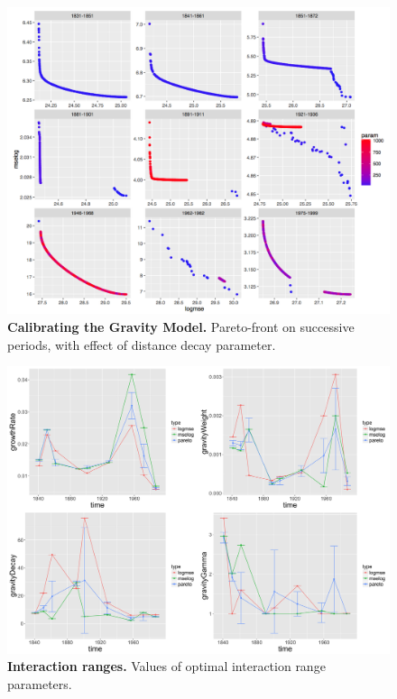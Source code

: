 \documentclass[Royal,sageh,times]{sagej}
\begin{document}
\begin{figure}
\centering
\includegraphics[width=\textwidth]{figures/Fig4}
\caption{\textbf{Calibrating the Gravity Model.} Pareto-front on successive periods, with effect of distance decay parameter.}
\label{fig:calib-gravity}
\end{figure}


\begin{figure}
\centering
\includegraphics[width=\textwidth]{figures/Fig5}
\caption{\textbf{Interaction ranges.} Values of optimal interaction range parameters.}
\label{fig:gravitydecay}
\end{figure}
\end{document}
